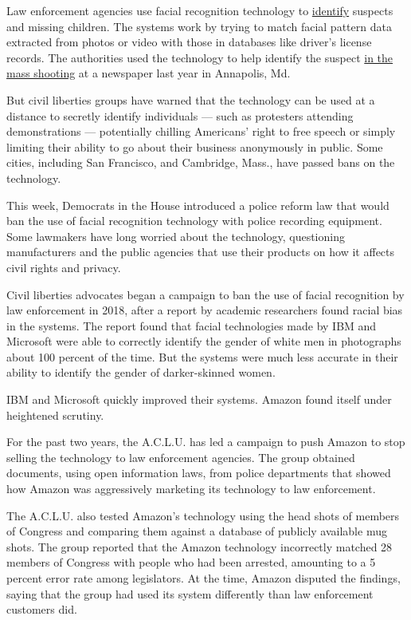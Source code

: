 Law enforcement agencies use facial recognition technology to
\href{https://www.nytimes.com/2019/06/09/opinion/facial-recognition-police-new-york-city.html}{identify}
suspects and missing children. The systems work by trying to match
facial pattern data extracted from photos or video with those in
databases like driver's license records. The authorities used the
technology to help identify the suspect
\href{https://www.nytimes.com/2019/04/29/us/capital-gazette-shooting-suspect.html}{in
the mass shooting} at a newspaper last year in Annapolis, Md.

But civil liberties groups have warned that the technology can be used
at a distance to secretly identify individuals --- such as protesters
attending demonstrations --- potentially chilling Americans' right to
free speech or simply limiting their ability to go about their business
anonymously in public. Some cities, including San Francisco, and
Cambridge, Mass., have passed bans on the technology.

This week, Democrats in the House introduced a police reform law that
would ban the use of facial recognition technology with police recording
equipment. Some lawmakers have long worried about the technology,
questioning manufacturers and the public agencies that use their
products on how it affects civil rights and privacy.

Civil liberties advocates began a campaign to ban the use of facial
recognition by law enforcement in 2018, after a report by academic
researchers found racial bias in the systems. The report found that
facial technologies made by IBM and Microsoft were able to correctly
identify the gender of white men in photographs about 100 percent of the
time. But the systems were much less accurate in their ability to
identify the gender of darker-skinned women.

IBM and Microsoft quickly improved their systems. Amazon found itself
under heightened scrutiny.

For the past two years, the A.C.L.U. has led a campaign to push Amazon
to stop selling the technology to law enforcement agencies. The group
obtained documents, using open information laws, from police departments
that showed how Amazon was aggressively marketing its technology to law
enforcement.

The A.C.L.U. also tested Amazon's technology using the head shots of
members of Congress and comparing them against a database of publicly
available mug shots. The group reported that the Amazon technology
incorrectly matched 28 members of Congress with people who had been
arrested, amounting to a 5 percent error rate among legislators. At the
time, Amazon disputed the findings, saying that the group had used its
system differently than law enforcement customers did.

